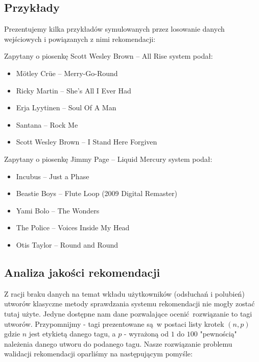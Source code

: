 \documentclass[a4paper,10pt]{article}
\begin{document}
\subsection{Przykłady}
Prezentujemy kilka przykładów symulowanych przez losowanie danych wejściowych i powiązanych z nimi rekomendacji:

Zapytany o piosenkę Scott Wesley Brown  --  All Rise system podał:
\begin{itemize}
 \item Mötley Crüe  --  Merry-Go-Round
 \item Ricky Martin  --  She's All I Ever Had
 \item Erja Lyytinen  --  Soul Of A Man
 \item Santana  --  Rock Me
 \item Scott Wesley Brown  --  I Stand Here Forgiven
\end{itemize}

Zapytany o piosenkę Jimmy Page  --  Liquid Mercury system podał:
\begin{itemize}
 \item Incubus  --  Just a Phase
 \item Beastie Boys  --  Flute Loop (2009 Digital Remaster)
 \item Yami Bolo  --  The Wonders
 \item The Police  --  Voices Inside My Head
 \item Otis Taylor  --  Round and Round
\end{itemize}

\subsection{Analiza jakości rekomendacji}

Z racji braku danych na temat wkładu użytkowników (odsłuchań i polubień) utworów klasyczne metody sprawdzania systemu rekomendacji nie mogły zostać tutaj użyte. Jedyne dostępne nam dane pozwalające ocenić rozwiązanie to tagi utworów. Przypomnijmy - tagi prezentowane są w postaci listy krotek $\left(n, p\right)$ gdzie $n$ jest etykietą danego tagu, a $p$ - wyrażoną od $1$ do $100$ "pewnością" należenia danego utworu do podanego tagu. Nasze rozwiązanie problemu walidacji rekomendacji oparliśmy na następującym pomyśle:
\end{document}
